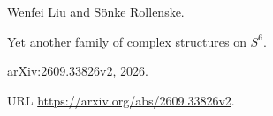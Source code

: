 Wenfei Liu and S{\"o}nke Rollenske.

\newblock Yet another family of complex structures on {$S^6$}.

\newblock arXiv:2609.33826v2, 2026.

\newblock URL \url{https://arxiv.org/abs/2609.33826v2}.

